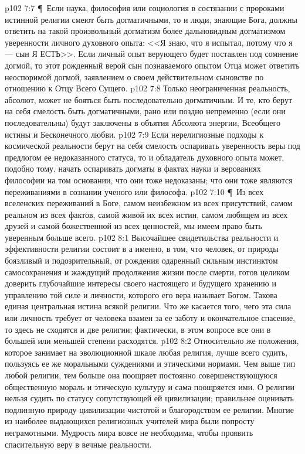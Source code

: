\vs p102 7:7 \P\ Если наука, философия или социология в состязании с пророками истинной религии смеют быть догматичными, то и люди, знающие Бога, должны ответить на такой произвольный догматизм более дальновидным догматизмом уверенности личного духовного опыта: <<Я знаю, что я испытал, потому что я --- сын Я ЕСТЬ>>. Если личный опыт верующего будет поставлен под сомнение догмой, то этот рожденный верой сын познаваемого опытом Отца может ответить неоспоримой догмой, заявлением о своем действительном сыновстве по отношению к Отцу Всего Сущего.
\vs p102 7:8 Только неограниченная реальность, абсолют, может не бояться быть последовательно догматичным. И те, кто берут на себя смелость быть догматичными, рано или поздно непременно (если они последовательны) будут заключены в объятия Абсолюта энергии, Всеобщего истины и Бесконечного любви.
\vs p102 7:9 Если нерелигиозные подходы к космической реальности берут на себя смелость оспаривать уверенность веры под предлогом ее недоказанного статуса, то и обладатель духовного опыта может, подобно тому, начать оспаривать догматы в фактах науки и верованиях философии на том основании, что они тоже недоказаны; что они тоже являются переживаниями в сознании ученого или философа.
\vs p102 7:10 \P\ Из всех вселенских переживаний в Боге, самом неизбежном из всех присутствий, самом реальном из всех фактов, самой живой их всех истин, самом любящем из всех друзей и самой божественной из всех ценностей, мы имеем право быть уверенным больше всего.
\vs p102 8:1 Высочайшее свидетильства реальности и эффективности религии состоит в  а именно, в том, что человек, от природы боязливый и подозрительный, от рождения одаренный сильным инстинктом самосохранения и жаждущий продолжения жизни после смерти, готов целиком доверить глубочайшие интересы своего настоящего и будущего хранению и управлению той силе и личности, которого его вера называет Богом. Такова единая центральная истина всякой религии. Что же касается того, чего эта сила или личность требует от человека взамен за ее заботу и окончательное спасение, то здесь не сходятся и две религии; фактически, в этом вопросе все они в большей или меньшей степени расходятся.
\vs p102 8:2 Относительно же положения, которое занимает на эволюционной шкале любая религия, лучше всего судить, пользуясь ее же моральными суждениями и этическими нормами. Чем выше тип любой религии, тем больше она поощряет постоянно совершенствующуюся общественную мораль и этическую культуру и сама поощряется ими. О религии нельзя судить по статусу сопутствующей ей цивилизации; правильнее оценивать подлинную природу цивилизации чистотой и благородством ее религии. Многие из наиболее выдающихся религиозных учителей мира были попросту неграмотными. Мудрость мира вовсе не необходима, чтобы проявить спасительную веру в вечные реальности.

